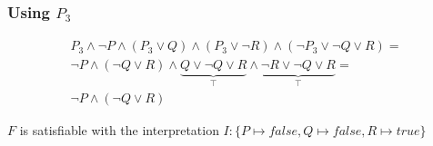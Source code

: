 \documentclass[a4paper,11pt]{report}
\begin{document}
\subsubsection*{Using $P_3$}

\begin{gather*}
  P_3 \wedge \neg P \wedge (P_3 \vee Q) \wedge (P_3 \vee \neg R) \wedge (\neg
  P_3 \vee \neg Q \vee R) = \\
  \neg P \wedge (\neg Q \vee R) \wedge \underbrace{Q \vee \neg Q \vee R}_\top
  \wedge \underbrace{\neg R \vee \neg Q \vee R}_\top = \\
  \neg P \wedge (\neg Q \vee R)
\end{gather*}

$F$ is satisfiable with the interpretation $I : \{ P \mapsto false, Q \mapsto
false, R \mapsto true \}$
\end{document}
